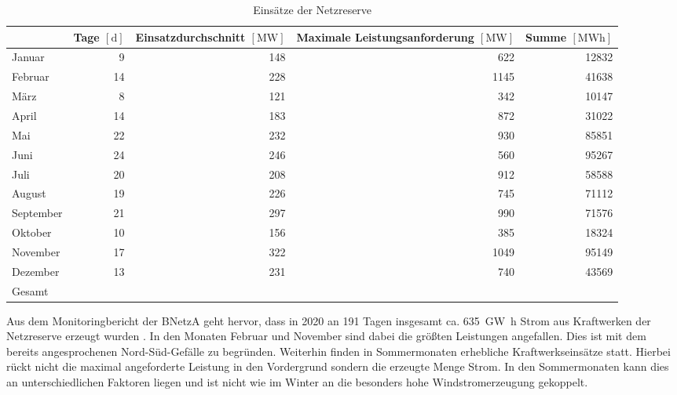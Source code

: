 			\begin{table}[H]
				\centering
				\caption{Einsätze der Netzreserve \cite{Monitoringbericht_BNetzA}}
				\label{Tab. Einsätze Netzreserve}
				\begin{tabular}{lrrrr}
					& \makecell[c]{Tage \\ $\left[\si{\day}\right]$} & \makecell[c]{Einsatzdurchschnitt \\ $\left[\si{\mega\watt}\right]$} & \makecell[c]{Maximale Leistungsanforderung \\ $\left[\si{\mega\watt}\right]$} & \makecell[c]{Summe \\ $\left[\si{\mega\watt\hour}\right]$} \\ \hline
					Januar & \num{9} & \num{148} & \num{622} & \num{12832} \\
					Februar & \num{14} & \num{228} & \num{1145} & \num{41638} \\
					März & \num{8} & \num{121} & \num{342} & \num{10147} \\
					April & \num{14} & \num{183} & \num{872} & \num{31022} \\
					Mai & \num{22} & \num{232} & \num{930} & \num{85851} \\
					Juni & \num{24} & \num{246} & \num{560} & \num{95267} \\
					Juli & \num{20} & \num{208} & \num{912} & \num{58588} \\
					August & \num{19} & \num{226} & \num{745} & \num{71112} \\
					September & \num{21} & \num{297} & \num{990} & \num{71576} \\
					Oktober & \num{10} & \num{156} & \num{385} & \num{18324} \\
					November & \num{17} & \num{322} & \num{1049} & \num{95149} \\
					Dezember & \num{13} & \num{231} & \num{740} & \num{43569} \\ \hline
					Gesamt & \uuline{\num{191}} &  &  & \uuline{\num{635074}} \\ \hline
				\end{tabular}
			\end{table}
			
			Aus dem Monitoringbericht der BNetzA geht hervor, dass in 2020 an \num{191} Tagen insgesamt ca. \SI{635}{\giga\watt\hour} Strom aus Kraftwerken der Netzreserve erzeugt wurden \cite{Monitoringbericht_BNetzA}.
			In den Monaten Februar und November sind dabei die größten Leistungen angefallen.
			Dies ist mit dem bereits angesprochenen Nord-Süd-Gefälle zu begründen.	
			Weiterhin finden in Sommermonaten erhebliche Kraftwerkseinsätze statt.
			Hierbei rückt nicht die maximal angeforderte Leistung in den Vordergrund sondern die erzeugte Menge Strom.
			In den Sommermonaten kann dies an unterschiedlichen Faktoren liegen und ist nicht wie im Winter an die besonders hohe Windstromerzeugung gekoppelt.
		    
